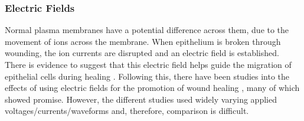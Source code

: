 \documentclass[11pt, oneside]{article}   	%
\newcommand{\todo}[1]{ \textcolor{red}{\bf{To Do:} #1}}
\begin{document}
\subsubsection{Electric Fields}

Normal plasma membranes have a potential difference across them, due to the movement of ions across the membrane.
When epithelium is broken through wounding, the ion currents are disrupted and an electric field is established.
There is evidence to suggest that this electric field helps guide the migration of epithelial cells during healing \cite{Zhao2009electrical}.
Following this, there have been studies into the effects of using electric fields for the promotion of wound healing \cite{Thakral2013electrical, Messerli2011extracellular}, many of which showed promise.
However, the different studies used widely varying applied voltages/currents/waveforms and, therefore, comparison is difficult.


%
\end{document}
